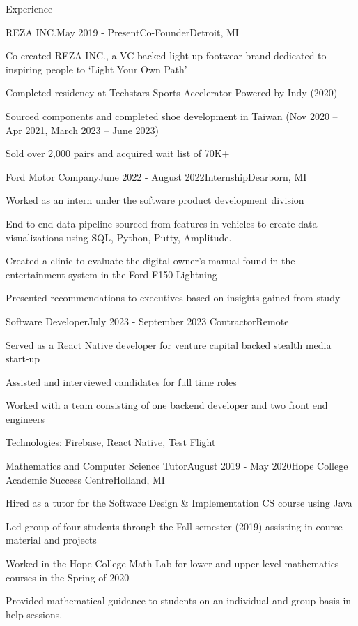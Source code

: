 \documentclass[
	11pt, %
]{resume} %
\begin{document}
\begin{rSection}{Experience}
	\begin{rSubsection}{REZA INC.}{May 2019 - Present}{Co-Founder}{Detroit, MI}
  \item Co-created REZA INC., a VC backed light-up footwear
brand dedicated to inspiring people to ‘Light Your Own
Path’
\item Completed residency at Techstars Sports Accelerator Powered by Indy (2020)\item Sourced components and completed shoe development in Taiwan (Nov 2020 – Apr 2021, March 2023 – June 2023)
\item Sold over 2,000 pairs and acquired wait list of 70K+
	\end{rSubsection}


	\begin{rSubsection}{Ford Motor Company}{June 2022 - August 2022}{Internship}{Dearborn, MI}

  \item Worked as an intern under the software product development division 
  \item End to end data pipeline sourced from features in vehicles to create data visualizations using SQL, Python, Putty, Amplitude.
  \item  Created a clinic to evaluate the digital owner's manual found in the entertainment system in the Ford F150 Lightning
  \item Presented recommendations to executives based on insights gained from study
	\end{rSubsection}

	\begin{rSubsection}{Software Developer}{July 2023 - September 2023 }{Contractor}{Remote}
  \item Served as a React Native developer for venture capital backed stealth media start-up
  \item Assisted and interviewed candidates for full time roles
  \item Worked with a team consisting of one backend developer
and two front end engineers
\item Technologies: Firebase, React Native, Test Flight

	\end{rSubsection}

  \begin{rSubsection}{ Mathematics and Computer Science Tutor}{August 2019 - May 2020}{Hope College Academic Success Centre}{Holland, MI}
    \item Hired as a tutor for the Software Design \& Implementation CS course using Java
    \item Led group of four students through the Fall semester (2019) assisting in course material and projects
    \item Worked in the Hope College Math Lab for lower and upper-level mathematics courses in the Spring of 2020
    \item  Provided mathematical guidance to students on an individual and group basis in help sessions.
	\end{rSubsection}


\end{rSection}
\end{document}
